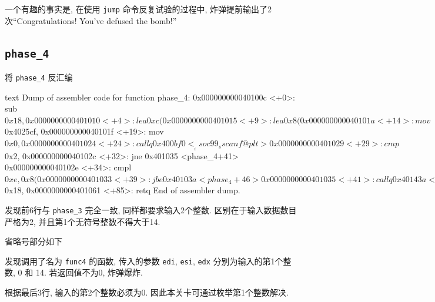 一个有趣的事实是, 在使用 \verb|jump| 命令反复试验的过程中, 炸弹提前输出了2次“Congratulations! You've defused the bomb!”

\subsection{\texttt{phase_4}}

将 \verb|phase_4| 反汇编
\begin{code}{text}
Dump of assembler code for function phase_4:
   0x000000000040100c <+0>:     sub    $0x18,%
   0x0000000000401010 <+4>:     lea    0xc(%
   0x0000000000401015 <+9>:     lea    0x8(%
   0x000000000040101a <+14>:    mov    $0x4025cf,%
   0x000000000040101f <+19>:    mov    $0x0,%
   0x0000000000401024 <+24>:    callq  0x400bf0 <__isoc99_sscanf@plt>
   0x0000000000401029 <+29>:    cmp    $0x2,%
   0x000000000040102c <+32>:    jne    0x401035 <phase_4+41>
   0x000000000040102e <+34>:    cmpl   $0xe,0x8(%
   0x0000000000401033 <+39>:    jbe    0x40103a <phase_4+46>
   0x0000000000401035 <+41>:    callq  0x40143a <explode_bomb>
   ...                          ...    ...
   0x000000000040105d <+81>:    add    $0x18,%
   0x0000000000401061 <+85>:    retq
End of assembler dump.
\end{code}
发现前6行与 \verb|phase_3| 完全一致, 同样都要求输入2个整数. 区别在于输入数据数目严格为2, 并且第1个无符号整数不得大于14.

省略号部分如下
发现调用了名为 \verb|func4| 的函数, 传入的参数 \verb|edi|, \verb|esi|, \verb|edx| 分别为输入的第1个整数, 0 和 14. 若返回值不为0, 炸弹爆炸. 

根据最后3行, 输入的第2个整数必须为0. 因此本关卡可通过枚举第1个整数解决.

